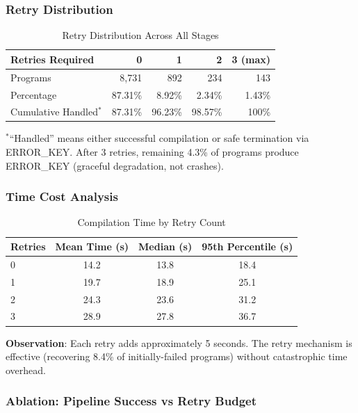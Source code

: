 \documentclass[11pt,a4paper]{article}
\begin{document}
\subsubsection{Retry Distribution}

\begin{table}[H]
\centering
\caption{Retry Distribution Across All Stages}
\label{tab:retries}
\begin{tabular}{@{}lrrrr@{}}
\toprule
\textbf{Retries Required} & \textbf{0} & \textbf{1} & \textbf{2} & \textbf{3 (max)} \\
\midrule
Programs & 8,731 & 892 & 234 & 143 \\
Percentage & 87.31\% & 8.92\% & 2.34\% & 1.43\% \\
Cumulative Handled$^*$ & 87.31\% & 96.23\% & 98.57\% & 100\% \\
\bottomrule
\end{tabular}
\end{table}
\footnotesize{$^*$``Handled'' means either successful compilation or safe termination via ERROR\_KEY. After 3 retries, remaining 4.3\% of programs produce ERROR\_KEY (graceful degradation, not crashes).}
\normalsize

\subsubsection{Time Cost Analysis}

\begin{table}[H]
\centering
\caption{Compilation Time by Retry Count}
\label{tab:retry-time}
\begin{tabular}{@{}lccc@{}}
\toprule
\textbf{Retries} & \textbf{Mean Time (s)} & \textbf{Median (s)} & \textbf{95th Percentile (s)} \\
\midrule
0 & 14.2 & 13.8 & 18.4 \\
1 & 19.7 & 18.9 & 25.1 \\
2 & 24.3 & 23.6 & 31.2 \\
3 & 28.9 & 27.8 & 36.7 \\
\bottomrule
\end{tabular}
\end{table}

\textbf{Observation}: Each retry adds approximately 5 seconds. The retry mechanism is effective (recovering 8.4\% of initially-failed programs) without catastrophic time overhead.

\subsubsection{Ablation: Pipeline Success vs Retry Budget}
\end{document}
